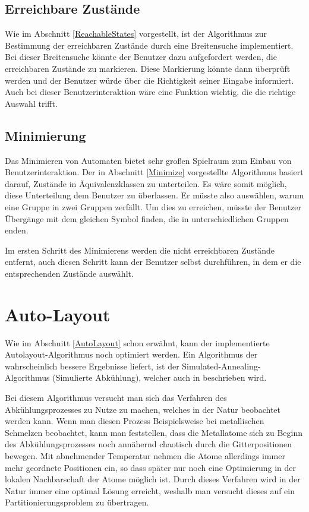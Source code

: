 \subsection{Erreichbare Zustände}\label{PerspectiveReachableStates}
Wie im Abschnitt \ref{ReachableStates} vorgestellt, ist der Algorithmus zur
Bestimmung der erreichbaren Zustände durch eine Breitensuche implementiert. Bei
dieser Breitensuche könnte der Benutzer dazu aufgefordert werden, die
erreichbaren Zustände zu markieren. Diese Markierung könnte dann überprüft werden
und der Benutzer würde über die Richtigkeit seiner Eingabe informiert. Auch bei
dieser Benutzerinteraktion wäre eine Funktion wichtig, die die richtige Auswahl
trifft.\vspace{10pt}


\subsection{Minimierung}\label{PerspectiveMinimize}
Das Minimieren von Automaten bietet sehr großen Spielraum zum Einbau von
Benutzerinteraktion. Der in Abschnitt \ref{Minimize} vorgestellte Algorithmus
basiert darauf, Zustände in Äquivalenz\-klassen zu unterteilen. Es wäre somit
möglich, diese Unterteilung dem Benutzer zu überlassen. Er müsste also
auswählen, warum eine Gruppe in zwei Gruppen zerfällt. Um dies zu erreichen,
müsste der Benutzer Übergänge mit dem gleichen Symbol finden, die in
unterschiedlichen Gruppen enden.\vspace{10pt}

Im ersten Schritt des Minimierens werden die nicht erreichbaren Zustände
entfernt, auch diesen Schritt kann der Benutzer selbst durchführen, in dem er die
entsprechenden Zustände auswählt.\vspace{10pt}


\section{Auto-Layout}\label{PerspectiveAutoLayout}

Wie im Abschnitt \ref{AutoLayout} schon erwähnt, kann der implementierte
Autolayout-Algorithmus noch optimiert werden. Ein Algorithmus der wahrscheinlich
bessere Ergebnisse liefert, ist der Simulated-Annealing-Algorithmus (Simulierte
Abkühlung), welcher auch in \cite{Layout} beschrieben wird.\vspace{10pt}

Bei diesem Algorithmus versucht man sich das Verfahren des Ab\-kühlungs\-pro\-zes\-ses zu
Nutze zu machen, welches in der Natur beobachtet werden kann. Wenn man diesen
Prozess Beispielsweise bei metallischen Schmelzen beobachtet, kann man
feststellen, dass die Metallatome sich zu Beginn des Ab\-kühlungs\-pro\-zes\-ses noch
annähernd chaotisch durch die Gitterpositionen bewegen. Mit abnehmender
Temperatur nehmen die Atome allerdings immer mehr geordnete Positionen ein, so
dass später nur noch eine Optimierung in der lokalen Nachbarschaft der Atome
möglich ist. Durch dieses Verfahren wird in der Natur immer eine
optimal Lösung erreicht, weshalb man versucht dieses auf ein
Partitionierungsproblem zu übertragen.\vspace{10pt}

